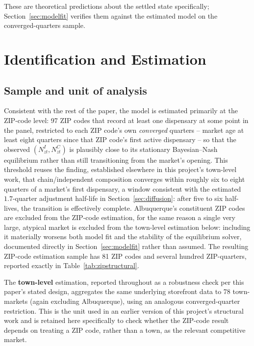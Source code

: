 \documentclass[english,12pt]{article}
\begin{document}
These are theoretical predictions about the settled state specifically; Section~\ref{sec:modelfit} verifies them against the estimated model on the converged-quarters sample.

\FloatBarrier

\section{Identification and Estimation}
\label{sec:identification}

\subsection{Sample and unit of analysis}

Consistent with the rest of the paper, the model is estimated primarily at the ZIP-code level: 97 ZIP codes that record at least one dispensary at some point in the panel, restricted to each ZIP code's own \emph{converged} quarters -- market age at least eight quarters since that ZIP code's first active dispensary -- so that the observed $(N^I_{zt}, N^C_{zt})$ is plausibly close to its stationary Bayesian--Nash equilibrium rather than still transitioning from the market's opening. This threshold reuses the finding, established elsewhere in this project's town-level work, that chain/independent composition converges within roughly six to eight quarters of a market's first dispensary, a window consistent with the estimated $1.7$-quarter adjustment half-life in Section~\ref{sec:diffusion}: after five to six half-lives, the transition is effectively complete. Albuquerque's constituent ZIP codes are excluded from the ZIP-code estimation, for the same reason a single very large, atypical market is excluded from the town-level estimation below: including it materially worsens both model fit and the stability of the equilibrium solver, documented directly in Section~\ref{sec:modelfit} rather than assumed. The resulting ZIP-code estimation sample has 81 ZIP codes and several hundred ZIP-quarters, reported exactly in Table~\ref{tab:zipstructural}.

The \textbf{town-level} estimation, reported throughout as a robustness check per this paper's stated design, aggregates the same underlying storefront data to 78 town-markets (again excluding Albuquerque), using an analogous converged-quarter restriction. This is the unit used in an earlier version of this project's structural work and is retained here specifically to check whether the ZIP-code result depends on treating a ZIP code, rather than a town, as the relevant competitive market.
\end{document}
